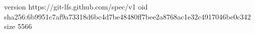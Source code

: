 version https://git-lfs.github.com/spec/v1
oid sha256:6b9951c7af9a73318d6bc4d7be48480ff7bee2a8768ac1e32c4917046be0c342
size 5566
